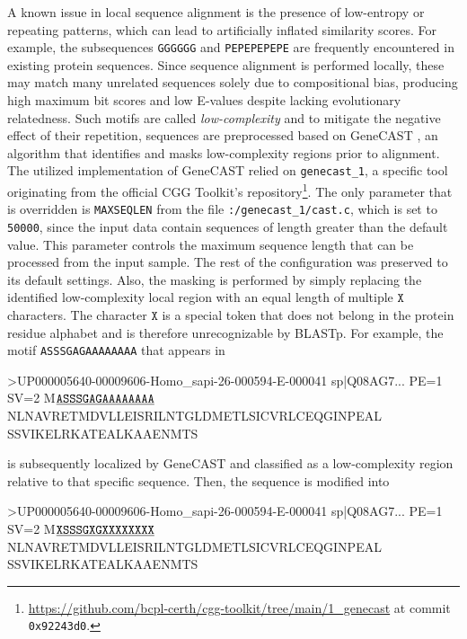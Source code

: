 A known issue in local sequence alignment is the presence of low-entropy or
repeating patterns, which can lead to artificially inflated similarity scores.
For example, the subsequences \texttt{GGGGGG} and \texttt{PEPEPEPEPE} are
frequently encountered in existing protein sequences. Since sequence alignment is
performed locally, these may match many unrelated sequences solely due to
compositional bias, producing high maximum bit scores and low E-values despite
lacking evolutionary relatedness. Such motifs are called
\textit{low-complexity} and to mitigate the negative effect of their
repetition, sequences are preprocessed based on GeneCAST \cite{genecast}, an
algorithm that identifies and masks low-complexity regions prior to alignment.
The utilized implementation of GeneCAST relied on \texttt{genecast\_1}, a
specific tool originating from the official CGG Toolkit's
repository\footnote{\url{https://github.com/bcpl-certh/cgg-toolkit/tree/main/1_genecast}
at commit \texttt{0x92243d0}.}. The only parameter that is overridden is
\texttt{MAXSEQLEN} from the file \texttt{:/genecast\_1/cast.c}, which is set to
\texttt{50000}, since the input data contain sequences of length greater than
the default value. This parameter controls the maximum sequence length that can
be processed from the input sample. The rest of the configuration was preserved
to its default settings. Also, the masking is performed by simply replacing the
identified low-complexity local region with an equal length of multiple
\(\texttt{X}\) characters. The character \(\texttt{X}\) is a special token that
does not belong in the protein residue alphabet and is therefore unrecognizable
by BLASTp. For example, the motif \texttt{ASSSGAGAAAAAAAA} that appears in

\begin{plaintext}
>UP000005640-00009606-Homo_sapi-26-000594-E-000041 sp|Q08AG7... PE=1 SV=2
M$\texttt{\underline{ASSSGAGAAAAAAAA}}$NLNAVRETMDVLLEISRILNTGLDMETLSICVRLCEQGINPEAL
SSVIKELRKATEALKAAENMTS
\end{plaintext}

is subsequently localized by GeneCAST and classified as a low-complexity region relative to that specific sequence. Then, the sequence is modified into

\begin{plaintext}
>UP000005640-00009606-Homo_sapi-26-000594-E-000041 sp|Q08AG7... PE=1 SV=2 
M$\texttt{\underline{XSSSGXGXXXXXXXX}}$NLNAVRETMDVLLEISRILNTGLDMETLSICVRLCEQGINPEAL 
SSVIKELRKATEALKAAENMTS
\end{plaintext}

